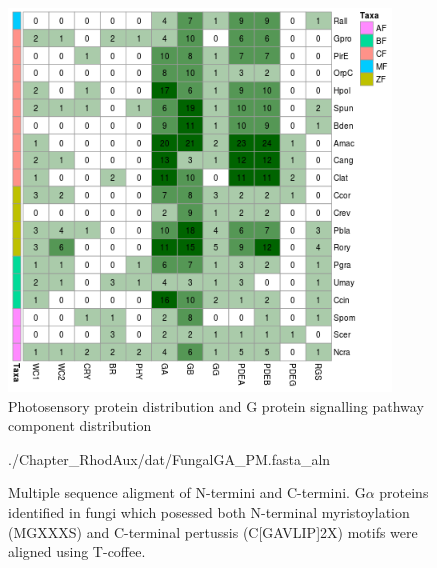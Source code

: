
\begin{figure}[hb]
  \centering
  \includegraphics[width=4in]{./Chapter_RhodAux/img/photosenseHeatmap.png}
  \caption[Photosensory survey]{Photosensory protein distribution and G protein signalling pathway component distribution}
  \label{fig:ChRhodA_photosenseSurvey}
\end{figure}

\begin{figure}[hb]
  \centering
  \begin{texshade}{./Chapter_RhodAux/dat/FungalGA_PM.fasta_aln}
    \hidenumbering
  \end{texshade}
  \caption[Galpha MSA]{Multiple sequence aligment of N-termini and C-termini. G$\alpha$ proteins identified in fungi which posessed both N-terminal myristoylation (MGXXXS) and C-terminal pertussis (C[GAVLIP]{2}X) motifs were aligned using T-coffee.}
  \label{fig:ChRhodA_gaMSA}
\end{figure}

